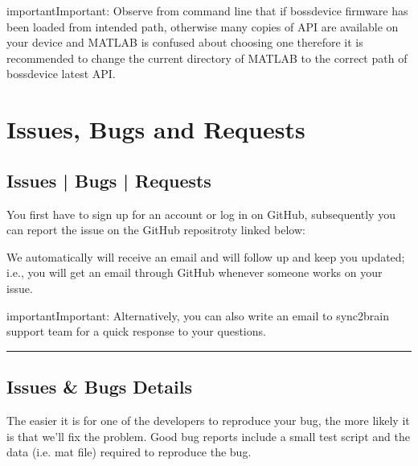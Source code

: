 \documentclass[letterpaper,10pt,english]{sphinxmanual}
\begin{document}
\begin{sphinxadmonition}{important}{Important:}
\sphinxAtStartPar
Observe from command line that if bossdevice firmware has been loaded from intended path, otherwise many copies of API are available on your device and MATLAB is confused about choosing one therefore it is recommended to change the current directory of MATLAB to the correct path of bossdevice latest API.
\end{sphinxadmonition}


\chapter{Issues, Bugs and Requests}
\label{\detokenize{7_issues_bugs_requests:issues-bugs-and-requests}}\label{\detokenize{7_issues_bugs_requests::doc}}

\section{Issues | Bugs | Requests}
\label{\detokenize{7_issues_bugs_requests:issues-bugs-requests}}
\sphinxAtStartPar
You first have to sign up for an account or log in on GitHub, subsequently you can report the issue on the GitHub repositroty linked below:

\begin{sphinxVerbatim}[commandchars=\\\{\}]
\end{sphinxVerbatim}

\sphinxAtStartPar
We automatically will receive an email and will follow up and keep you updated; i.e., you will get an email through GitHub whenever someone works on your issue.

\begin{sphinxadmonition}{important}{Important:}
\sphinxAtStartPar
Alternatively, you can also write an email to sync2brain support team for a quick response to your questions.
\end{sphinxadmonition}


\bigskip\hrule\bigskip



\section{Issues \& Bugs Details}
\label{\detokenize{7_issues_bugs_requests:issues-bugs-details}}
\sphinxAtStartPar
The easier it is for one of the developers to reproduce your bug, the more likely it is that we’ll fix the problem. Good bug reports include a small test script and the data (i.e. mat file) required to reproduce the bug.
\end{document}
